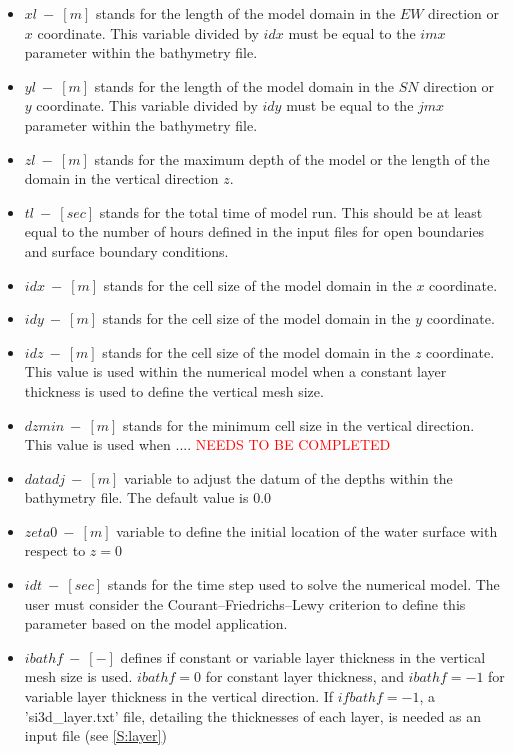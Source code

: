 \begin{itemize}
    \item $xl\ -\ [m]$ stands for the length of the model domain in the $EW$ direction or $x$ coordinate. This variable divided by $idx$ must be equal to the $imx$ parameter within the bathymetry file.
    \item $yl\ -\ [m]$ stands for the length of the model domain in the $SN$ direction or $y$ coordinate. This variable divided by $idy$ must be equal to the $jmx$ parameter within the bathymetry file.
    \item $zl\ -\ [m]$ stands for the maximum depth of the model or the length of the domain in the vertical direction $z$.
    \item $tl\ -\ [sec]$ stands for the total time of model run. This should be at least equal to the number of hours defined in the input files for open boundaries and surface boundary conditions.
    \item $idx\ -\ [m]$ stands for the cell size of the model domain in the $x$ coordinate.
    \item $idy\ -\ [m]$ stands for the cell size of the model domain in the $y$ coordinate.
    \item $idz\ -\ [m]$ stands for the cell size of the model domain in the $z$ coordinate. This value is used within the numerical model when a constant layer thickness is used to define the vertical mesh size. 
    \item $dzmin\ -\ [m]$ stands for the minimum cell size in the vertical direction. This value is used when .... \textcolor{red}{NEEDS TO BE COMPLETED}
    \item $datadj\ -\ [m]$ variable to adjust the datum of the depths within the bathymetry file. The default value is $0.0$
    \item $zeta0\ -\ [m]$ variable to define the initial location of the water surface with respect to $z = 0$
    \item $idt\ -\ [sec]$ stands for the time step used to solve the numerical model. The user must consider the Courant–Friedrichs–Lewy criterion to define this parameter based on the model application.
    \item $ibathf\ -\ [-]$ defines if constant or variable layer thickness in the vertical mesh size is used. $ibathf = 0$ for constant layer thickness, and $ibathf = -1$ for variable layer thickness in the vertical direction. If $ifbathf = -1$, a 'si3d\_layer.txt' file, detailing the thicknesses of each layer, is needed as an input file (see \ref{S:layer})
\end{itemize}


